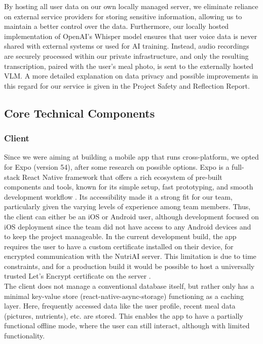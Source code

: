 \documentclass[11pt,a4paper]{article}
\begin{document}
\noindent
By hosting all user data on our own locally managed server, we eliminate reliance on external service providers for storing sensitive information, allowing us to maintain a better control over the data. Furthermore, our locally hosted implementation of OpenAI’s Whisper model ensures that user voice data is never shared with external systems or used for AI training. Instead, audio recordings are securely processed within our private infrastructure, and only the resulting transcription, paired with the user’s meal photo, is sent to the externally hosted VLM. A more detailed explanation on data privacy and possible improvements in this regard for our service is given in the Project Safety and Reflection Report.
\FloatBarrier\subsection{Core Technical Components}
\label{chap:3.2}

\subsubsection{Client}
\noindent
Since we were aiming at building a mobile app that runs cross-platform, we opted for Expo (version 54), after some research on possible options. Expo is a full-stack React Native framework that offers a rich ecosystem of pre-built components and tools, known for its simple setup, fast prototyping, and smooth development workflow \cite{expo}. Its accessibility made it a strong fit for our team, particularly given the varying levels of experience among team members. Thus, the client can either be an iOS or Android user, although development focused on iOS deployment since the team did not have access to any Android devices and to keep the project manageable. In the current development build, the app requires the user to have a custom certificate installed on their device, for encrypted communication with the NutriAI server. This limitation is due to time constraints, and for a production build it would be possible to host a universally trusted Let's Encrypt certificate on the server \cite{lets}.\\
The client does not manage a conventional database itself, but rather only has a minimal key-value store (react-native-async-storage) \cite{async} functioning as a caching layer. Here, frequently accessed data like the user profile, recent meal data (pictures, nutrients), etc. are stored. This enables the app to have a partially functional offline mode, where the user can still interact, although with limited functionality. 
\end{document}
